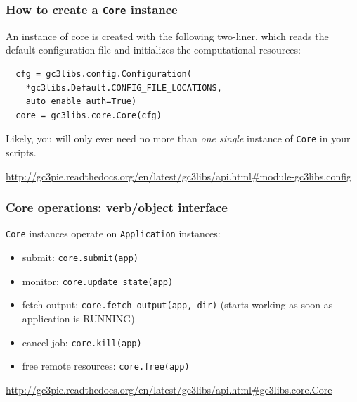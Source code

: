 \documentclass[english,serif,mathserif,xcolor=pdftex,dvipsnames,table]{beamer}
\begin{document}
\begin{frame}[fragile]
  \frametitle{How to create a \texttt{Core} instance}
  An instance of core is created with the following two-liner, which
  reads the default configuration file and initializes the
  computational resources:
\begin{lstlisting}
  cfg = gc3libs.config.Configuration(
    *gc3libs.Default.CONFIG_FILE_LOCATIONS,
    auto_enable_auth=True)
  core = gc3libs.core.Core(cfg)
\end{lstlisting}

\+ 
Likely, you will only ever need no more than \emph{one single}
instance of \texttt{Core} in your scripts.

\+
\begin{references}
  \url{http://gc3pie.readthedocs.org/en/latest/gc3libs/api.html#module-gc3libs.config}
\end{references}
\end{frame}


\begin{frame}[fragile]
\frametitle{Core operations: verb/object interface}

\texttt{Core} instances operate on \texttt{Application} instances:
\begin{itemize}
\item submit: \texttt{core.submit(app)}
\item monitor: \texttt{core.update\_state(app)}
\item fetch output: \texttt{core.fetch\_output(app, dir)} (starts working as soon as
    application is RUNNING)
\item cancel job: \texttt{core.kill(app)}
\item free remote resources: \texttt{core.free(app)}
\end{itemize}

\+
\begin{references}
  \url{http://gc3pie.readthedocs.org/en/latest/gc3libs/api.html#gc3libs.core.Core}
\end{references}
\end{frame}
\end{document}
